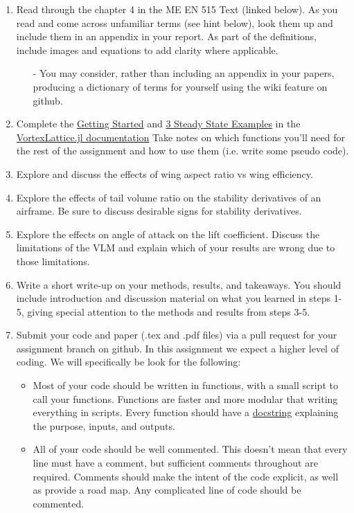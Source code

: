 \documentclass[12pt]{article}
\begin{document}
\begin{enumerate}
	\item Read  through the chapter 4 in the ME EN 515 Text (linked below).  As you read and come across unfamiliar terms (see hint below), look them up and include them in an appendix in your report.  As part of the definitions, include images and equations to add clarity where applicable.
	\begin{itemize}
		\item[-] You may consider, rather than including an appendix in your papers, producing a dictionary of terms for yourself using the wiki feature on github.
	\end{itemize}
	\item Complete the \href{https://flow.byu.edu/VortexLattice.jl/stable/guide/}{Getting Started} and \href{https://flow.byu.edu/VortexLattice.jl/stable/examples/#Steady-State-Analysis-of-a-Wing}{3 Steady State Examples} in the \href{https://flow.byu.edu/VortexLattice.jl/stable/}{VortexLattice.jl documentation} Take notes on which functions you'll need for the rest of the assignment and how to use them (i.e. write some pseudo code). 
	\item Explore and discuss the effects of wing aspect ratio vs wing efficiency. 
	\item Explore the effects of tail volume ratio on the stability derivatives of an airframe. Be sure to discuss desirable signs for stability derivatives.
	\item Explore the effects on angle of attack on the lift coefficient. Discuss the limitations of the VLM and explain which of your results are wrong due to those limitations.
	\item Write a short write-up on your methods, results, and takeaways. You should include introduction and discussion material on what you learned in steps 1-5, giving special attention to the methods and results from steps 3-5. 
		\item Submit your code and paper (.tex and .pdf files) via a pull request for your assignment branch on github. In this assignment we expect a higher level of coding. We will specifically be look for the following: 
	\begin{itemize}
		\item Most of your code should be written in functions, with a small script to call your functions. Functions are faster and more modular that writing everything in scripts.  Every function should have a \href{https://docs.julialang.org/en/v1/manual/documentation/#Writing-Documentation}{docstring} explaining the purpose, inputs, and outputs. 
		\item All of your code should be well commented. This doesn't mean that every line must have a comment, but sufficient comments throughout are required. Comments should make the intent of the code explicit, as well as provide a road map. Any complicated line of code should be commented. 
	\end{itemize}
\end{enumerate}
\end{document}
